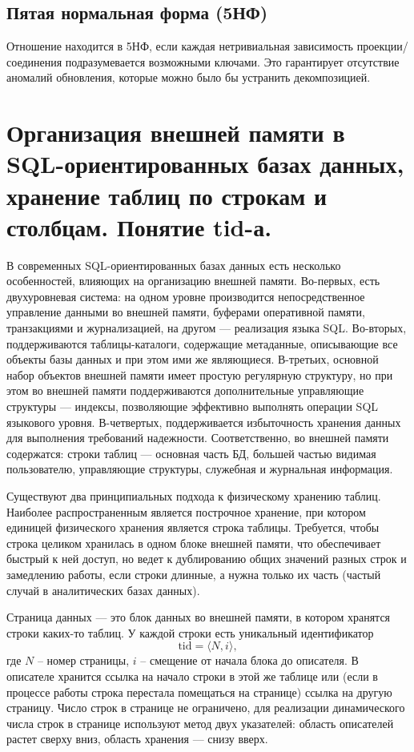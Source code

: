 \documentclass[a4paper,12pt]{article}
\begin{document}
\subsection{Пятая нормальная форма (5НФ)}

Отношение находится в 5НФ, если каждая нетривиальная зависимость проекции/соединения подразумевается возможными ключами. Это гарантирует отсутствие аномалий обновления, которые можно было бы устранить декомпозицией.



\section{Организация внешней памяти в SQL-ориентированных базах данных, хранение таблиц по строкам и столбцам. Понятие tid-а.}
В современных SQL-ориентированных базах данных есть несколько особенностей,
влияющих на организацию внешней памяти. Во-первых, есть двухуровневая система: на
одном уровне производится непосредственное управление данными во внешней памяти,
буферами оперативной памяти, транзакциями и журнализацией, на другом — реализация
языка SQL. Во-вторых, поддерживаются таблицы-каталоги, содержащие метаданные,
описывающие все объекты базы данных и при этом ими же являющиеся. В-третьих,
основной набор объектов внешней памяти имеет простую регулярную структуру, но при этом
во внешней памяти поддерживаются дополнительные управляющие структуры — индексы,
позволяющие эффективно выполнять операции SQL языкового уровня. В-четвертых,
поддерживается избыточность хранения данных для выполнения требований надежности.
Соответственно, во внешней памяти содержатся: строки таблиц — основная часть БД,
большей частью видимая пользователю, управляющие структуры, служебная и журнальная
информация.

Существуют два принципиальных подхода к физическому хранению таблиц.
Наиболее распространенным является построчное хранение, при котором единицей
физического хранения является строка таблицы. Требуется, чтобы строка целиком хранилась
в одном блоке внешней памяти, что обеспечивает быстрый к ней доступ, но ведет к
дублированию общих значений разных строк и замедлению работы, если строки длинные, а
нужна только их часть (частый случай в аналитических базах данных).

Страница данных — это блок данных во внешней памяти, в котором хранятся строки каких-то таблиц. У каждой строки есть уникальный идентификатор 
\[
\text{tid} = \langle N, i\rangle,
\] 
где $N$ – номер страницы, $i$ – смещение от начала блока до описателя. В описателе хранится ссылка на
начало строки в этой же таблице или (если в процессе работы строка перестала помещаться
на странице) ссылка на другую страницу. Число строк в странице не ограничено, для
реализации динамического числа строк в странице используют метод двух указателей:
область описателей растет сверху вниз, область хранения — снизу вверх.
\end{document}
